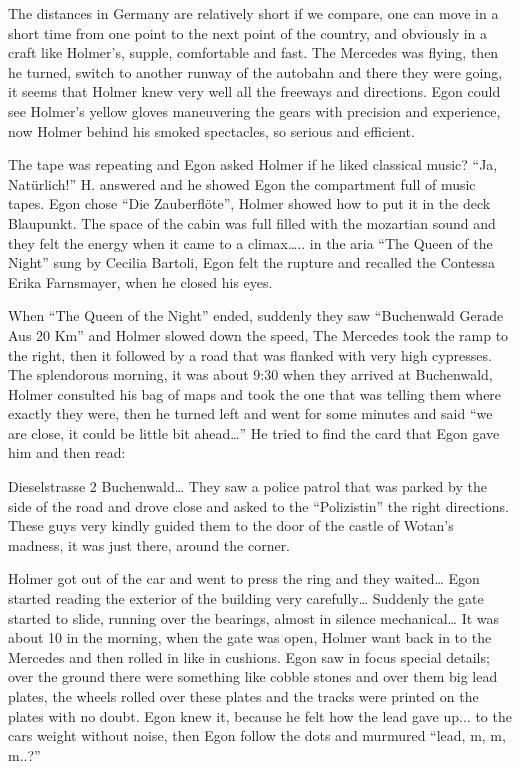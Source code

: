 \documentclass[smalldemyvopaper,11pt,twoside,onecolumn,openright,extrafontsizes]{memoir}
\begin{document}
The distances in Germany are relatively short if we compare, one can move in a short time from one point to the next point of the country, and obviously in a craft like Holmer’s, supple, comfortable and fast. The Mercedes was flying, then he turned, switch to another runway of the autobahn and there they were going, it seems that Holmer knew very well all the freeways and directions. Egon could see Holmer’s yellow gloves maneuvering the gears with precision and experience, now Holmer behind his smoked spectacles, so serious and efficient.

The tape was repeating and Egon asked Holmer if he liked classical music? “Ja, Natürlich!”  H. answered and he showed Egon the compartment full of music tapes. Egon chose “Die Zauberflöte”, Holmer showed how to put it in the deck Blaupunkt. The space of the cabin was full filled with the mozartian sound and they felt the energy when it came to a climax….. in the aria “The Queen of the Night” sung by Cecilia Bartoli, Egon felt the rupture and recalled the Contessa Erika Farnsmayer, when he closed his eyes.

When “The Queen of the Night” ended, suddenly they saw “Buchenwald Gerade Aus 20 Km” and Holmer slowed down the speed, The Mercedes took the ramp to the right, then it followed by a road that was flanked with very high cypresses. The splendorous morning, it was about 9:30 when they arrived at Buchenwald, Holmer consulted his bag of maps and took the one that was telling them where exactly they were, then he turned left and went for some minutes and said “we are close, it could be little bit ahead…”  He tried to find the card that Egon gave him and then read:

Dieselstrasse 2 Buchenwald… They saw a police patrol that was parked by the side of the road and drove close and asked to the “Polizistin” the right directions. These guys very kindly guided them to the door of the castle of Wotan’s madness, it was just there, around the corner.

Holmer got out of the car and went to press the ring and they waited… Egon started reading the exterior of the building very carefully… Suddenly the gate started to slide, running over the bearings, almost in silence mechanical… It was about 10 in the morning, when the gate was open, Holmer want back in to the Mercedes and then rolled in like in cushions. Egon saw in focus special details; over the ground there were something like cobble stones and over them big lead plates, the wheels rolled over these plates and the tracks were printed on the plates with no doubt. Egon knew it, because he felt how the lead gave up... to the cars weight without noise, then Egon follow the dots and murmured “lead, m, m, m..?” 
\end{document}
